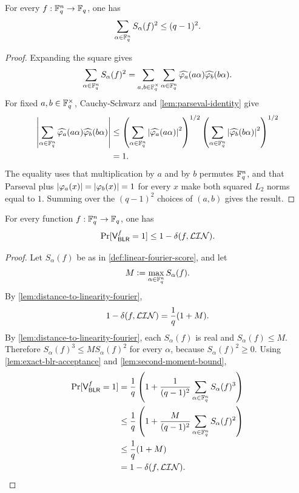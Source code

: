 \begin{lemma}
\label{lem:second-moment-bound}
\leanok
For every $f:{\mathbb F}_q^n\to{\mathbb F}_q$, one has
\[
    \sum_{\alpha\in{\mathbb F}_q^n} S_\alpha(f)^2 \le (q-1)^2.
\]
\end{lemma}

\begin{proof}\leanok
Expanding the square gives
\[
    \sum_{\alpha\in{\mathbb F}_q^n} S_\alpha(f)^2
    =\sum_{a,b\in{\mathbb F}_q^\times}
        \sum_{\alpha\in{\mathbb F}_q^n}
        \widehat{{\varphi}_{a}}(a\alpha)
        \widehat{{\varphi}_{b}}(b\alpha).
\]
For fixed $a,b\in{\mathbb F}_q^\times$, Cauchy-Schwarz and
\cref{lem:parseval-identity} give
\begin{align*}
\left\lvert{\sum_{\alpha\in{\mathbb F}_q^n}
        \widehat{{\varphi}_{a}}(a\alpha)
        \widehat{{\varphi}_{b}}(b\alpha)}\right\rvert
&\le
\left(\sum_{\alpha\in{\mathbb F}_q^n}\left\lvert{\widehat{{\varphi}_{a}}(a\alpha)}\right\rvert^2\right)^{1/2}
\left(\sum_{\alpha\in{\mathbb F}_q^n}\left\lvert{\widehat{{\varphi}_{b}}(b\alpha)}\right\rvert^2\right)^{1/2} \\
&=1.
\end{align*}
The equality uses that multiplication by $a$ and by $b$ permutes ${\mathbb F}_q^n$, and that
Parseval plus $\left\lvert{{\varphi}_{a}(x)}\right\rvert=\left\lvert{{\varphi}_{b}(x)}\right\rvert=1$ for every $x$
make both squared $L_2$ norms equal to \(1\).
Summing over the $(q-1)^2$ choices of $(a,b)$ gives the result.
\end{proof}

\begin{theorem}
\label{thm:finite-field-blr-soundness}
\leanok
For every function $f:{\mathbb F}_q^n\to{\mathbb F}_q$, one has
\[
    \Pr[\mathsf{V}_{\mathsf{BLR}}^f=1] \le 1-\delta(f,\mathcal{LIN}).
\]
\end{theorem}

\begin{proof}\leanok
Let $S_\alpha(f)$ be as in \cref{def:linear-fourier-score}, and let
\[
    M \mathrel{\mathop:}= \max_{\alpha\in{\mathbb F}_q^n}S_\alpha(f).
\]
By \cref{lem:distance-to-linearity-fourier},
\[
    1-\delta(f,\mathcal{LIN})=\frac{1}{q}(1+M).
\]
By \cref{lem:distance-to-linearity-fourier}, each $S_\alpha(f)$ is real and
$S_\alpha(f)\le M$.
Therefore $S_\alpha(f)^3\le M S_\alpha(f)^2$ for every $\alpha$, because
$S_\alpha(f)^2\ge 0$.
Using \cref{lem:exact-blr-acceptance} and \cref{lem:second-moment-bound},
\begin{align*}
    \Pr[\mathsf{V}_{\mathsf{BLR}}^f=1]
    &=\frac{1}{q}\left(1+\frac{1}{(q-1)^2}
        \sum_{\alpha\in{\mathbb F}_q^n}S_\alpha(f)^3\right) \\
    &\le \frac{1}{q}\left(1+\frac{M}{(q-1)^2}
        \sum_{\alpha\in{\mathbb F}_q^n}S_\alpha(f)^2\right) \\
    &\le \frac{1}{q}(1+M) \\
    &=1-\delta(f,\mathcal{LIN}).
\end{align*}
\end{proof}

